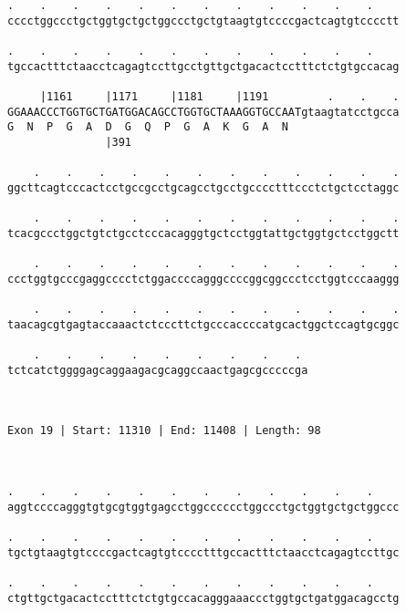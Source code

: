 \documentclass{article}
\begin{document}
\begin{Verbatim}
.    .    .    .    .    .    .    .    .    .    .    .    
cccctggccctgctggtgctgctggccctgctgtaagtgtccccgactcagtgtcccctt
                                                            
.    .    .    .    .    .    .    .    .    .    .    .    
tgccactttctaacctcagagtccttgcctgttgctgacactcctttctctgtgccacag
                                                            
     |1161     |1171     |1181     |1191         .    .    .
GGAAACCCTGGTGCTGATGGACAGCCTGGTGCTAAAGGTGCCAATgtaagtatcctgcca
G  N  P  G  A  D  G  Q  P  G  A  K  G  A  N                 
               |391                                         
  
    .    .    .    .    .    .    .    .    .    .    .    .
ggcttcagtcccactcctgccgcctgcagcctgcctgcccctttccctctgctcctaggc
                                                            
    .    .    .    .    .    .    .    .    .    .    .    .
tcacgccctggctgtctgcctcccacagggtgctcctggtattgctggtgctcctggctt
                                                            
    .    .    .    .    .    .    .    .    .    .    .    .
ccctggtgcccgaggcccctctggaccccagggccccggcggccctcctggtcccaaggg
                                                            
    .    .    .    .    .    .    .    .    .    .    .    .
taacagcgtgagtaccaaactctcccttctgcccaccccatgcactggctccagtgcggc
                                                            
    .    .    .    .    .    .    .    .    . 
tctcatctggggagcaggaagacgcaggccaactgagcgcccccga
                                              
                                              
 
Exon 19 | Start: 11310 | End: 11408 | Length: 98



.    .    .    .    .    .    .    .    .    .    .    .    
aggtccccagggtgtgcgtggtgagcctggcccccctggccctgctggtgctgctggccc
                                                            
.    .    .    .    .    .    .    .    .    .    .    .    
tgctgtaagtgtccccgactcagtgtcccctttgccactttctaacctcagagtccttgc
                                                            
.    .    .    .    .    .    .    .    .    .    .    .    
ctgttgctgacactcctttctctgtgccacagggaaaccctggtgctgatggacagcctg
                                                            

\end{Verbatim}
\end{document}

